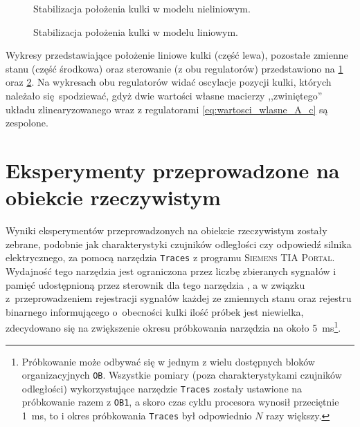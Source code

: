 \begin{figure}[h]
    
    \caption{Stabilizacja położenia kulki w modelu nieliniowym.}
    \label{fig:stabilizacja_modelu_nieliniowego}
\end{figure}

\begin{figure}[h]
    
    \caption{Stabilizacja położenia kulki w modelu liniowym.}
    \label{fig:stabilizacja_modelu_liniowego}
\end{figure}

Wykresy przedstawiające położenie liniowe kulki (część lewa), pozostałe zmienne stanu (część środkowa) oraz sterowanie (z obu regulatorów) przedstawiono na \cref{fig:stabilizacja_modelu_nieliniowego} oraz \cref{fig:stabilizacja_modelu_liniowego}. Na wykresach obu regulatorów widać oscylacje pozycji kulki, których należało się spodziewać, gdyż dwie wartości własne macierzy ,,zwiniętego'' układu zlinearyzowanego wraz z regulatorami \eqref{eq:wartosci_wlasne_A_c} są zespolone.

\section{Eksperymenty przeprowadzone na obiekcie rzeczywistym}
\label{sec:ch9_eksperymenty}

Wyniki eksperymentów przeprowadzonych na obiekcie rzeczywistym zostały zebrane, podobnie jak charakterystyki czujników odległości czy odpowiedź silnika elektrycznego, za pomocą narzędzia \texttt{Traces} z programu \textsc{Siemens TIA Portal}. Wydajność tego narzędzia jest ograniczona przez liczbę zbieranych sygnałów i pamięć udostępnioną przez sterownik dla tego narzędzia \cite{SIEMENSTRACE}, a w związku z~przeprowadzeniem rejestracji sygnałów każdej ze zmiennych stanu oraz rejestru binarnego informującego o~obecności kulki ilość próbek jest niewielka, zdecydowano się na zwiększenie okresu próbkowania narzędzia na około \SI{5}{\milli\second}\footnote{Próbkowanie może odbywać się w jednym z wielu dostępnych bloków organizacyjnych \texttt{OB}. Wszystkie pomiary (poza charakterystykami czujników odległości) wykorzystujące narzędzie \texttt{Traces} zostały ustawione na próbkowanie razem z \texttt{OB1}, a skoro czas cyklu procesora wynosił przeciętnie \SI{1}{\milli\second}, to i okres próbkowania \texttt{Traces} był odpowiednio $N$ razy większy.}.

